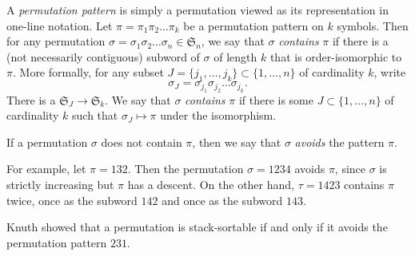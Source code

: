 \documentclass[12pt]{article}
\begin{document}

A \emph{permutation pattern} is simply a permutation viewed as its representation in one-line notation.  Let $\pi=\pi_1\pi_2\dots\pi_k$ be a permutation pattern on $k$ symbols.  Then for any permutation $\sigma=\sigma_1\sigma_2\dots\sigma_n\in\mathfrak{S}_n$, we say that $\sigma$ \emph{contains} $\pi$ if there is a (not necessarily contiguous) subword of $\sigma$ of length $k$ that is order-isomorphic to $\pi$.  More formally, 
for any subset $J=\{j_1,\dots,j_k\}\subset\{1,\dots,n\}$ of cardinality $k$, write 
\[
\sigma_J = \sigma_{j_1} \sigma_{j_2} \dots \sigma_{j_k}.
\]
There is a   $\mathfrak{S}_J\to\mathfrak{S}_k$.  We say that $\sigma$ \emph{contains} $\pi$ if there is some $J\subset\{1,\dots,n\}$ of cardinality $k$ such that $\sigma_J\mapsto \pi$ under the isomorphism.

If a permutation $\sigma$ does not contain $\pi$, then we say that $\sigma$ \emph{avoids} the pattern $\pi$.

For example, let $\pi=132$.  Then the permutation $\sigma=1234$ avoids $\pi$, since $\sigma$ is strictly increasing but $\pi$ has a descent.  On the other hand, $\tau=1423$ contains $\pi$ twice, once as the subword $142$ and once as the subword $143$.

Knuth showed that a permutation is stack-sortable if and only if it avoids the permutation pattern $231$.
\end{document}
